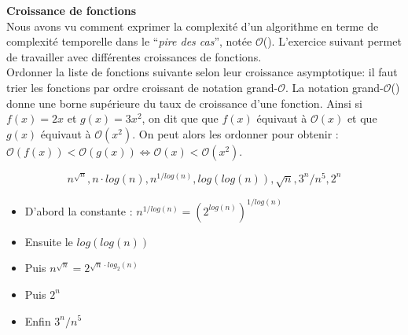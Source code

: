 \begin{Exercice}[10 minutes]\textbf{Croissance de fonctions}\\
	Nous avons vu comment exprimer la complexité d'un algorithme en terme de complexité temporelle dans le ``\emph{pire des cas}'', notée $\mathcal{O}$(). L'exercice suivant permet de travailler avec différentes croissances de fonctions.\\ Ordonner la liste de fonctions suivante selon leur croissance asymptotique: il faut trier les fonctions par ordre croissant de notation grand-$\mathcal{O}$. La notation grand-$\mathcal{O}$() donne une borne supérieure du taux de croissance d'une fonction. Ainsi si $f(x) = 2x$ et $g(x) = 3x^2$, on dit que que $f(x)$ équivaut à $\mathcal{O}(x)$ et que $g(x)$ équivaut à $\mathcal{O}(x^2)$. On peut alors les ordonner pour obtenir : $\mathcal{O}(f(x)) < \mathcal{O}(g(x)) \Leftrightarrow \mathcal{O}(x) < \mathcal{O}(x^2)$.
	
		\begin{equation}
			n^{\sqrt{n}}, n\cdot log(n), n^{1/log(n)}, log(log(n)), \sqrt{n}, 3^{n}/{n^5}, 2^n
		\end{equation}
		
		\begin{solution}
			\begin{itemize}
				\item D'abord la constante : $n^{1/log(n)} = (2^{log(n)})^{1/log(n)}$
				\item Ensuite le $log(log(n))$
				\item Puis $n^{\sqrt{n}} = 2^{\sqrt{n}\cdot log_2(n)}$
				\item Puis $2^n$
				\item Enfin  $3^{n}/{n^5}$
			\end{itemize}
		\end{solution}
	\end{Exercice}
	



